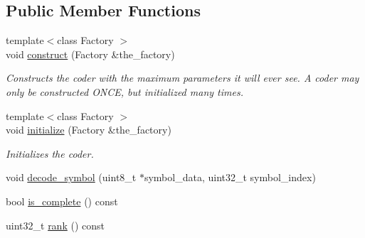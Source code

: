 \subsection*{Public Member Functions}
\begin{DoxyCompactItemize}
\item 
{\footnotesize template$<$class Factory $>$ }\\void \hyperlink{classkodo_1_1nocode__decoder_ac9d10e0f48174e27618085b915883b68}{construct} (Factory \&the\-\_\-factory)
\begin{DoxyCompactList}\small\item\em Constructs the coder with the maximum parameters it will ever see. A coder may only be constructed O\-N\-C\-E, but initialized many times. \end{DoxyCompactList}\item 
{\footnotesize template$<$class Factory $>$ }\\void \hyperlink{classkodo_1_1nocode__decoder_a3e9ab8de2e5c845aec3cab52690e3cdb}{initialize} (Factory \&the\-\_\-factory)
\begin{DoxyCompactList}\small\item\em Initializes the coder. \end{DoxyCompactList}\item 
void \hyperlink{classkodo_1_1nocode__decoder_af8b472f5cebffd2e7157577284ff60fe}{decode\-\_\-symbol} (uint8\-\_\-t $\ast$symbol\-\_\-data, uint32\-\_\-t symbol\-\_\-index)
\begin{DoxyCompactList}\small\item\em \end{DoxyCompactList}\item 
bool \hyperlink{classkodo_1_1nocode__decoder_a5b6467b818f433dd0292bf6f121674d5}{is\-\_\-complete} () const 
\begin{DoxyCompactList}\small\item\em \end{DoxyCompactList}\item 
uint32\-\_\-t \hyperlink{classkodo_1_1nocode__decoder_a231976634db0d0e2039a055cfbb1d80f}{rank} () const 
\begin{DoxyCompactList}\small\item\em \end{DoxyCompactList}\end{DoxyCompactItemize}
